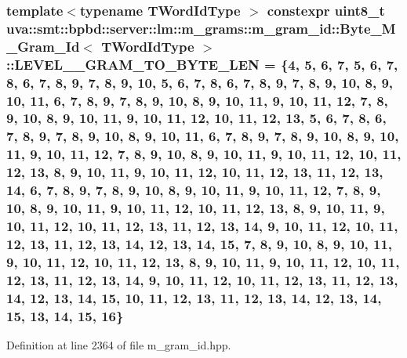 \subsubsection[{L\+E\+V\+E\+L\+\_\+4\+\_\+\+G\+R\+A\+M\+\_\+\+T\+O\+\_\+\+B\+Y\+T\+E\+\_\+\+L\+E\+N}]{\setlength{\rightskip}{0pt plus 5cm}template$<$typename T\+Word\+Id\+Type $>$ constexpr uint8\+\_\+t {\bf uva\+::smt\+::bpbd\+::server\+::lm\+::m\+\_\+grams\+::m\+\_\+gram\+\_\+id\+::\+Byte\+\_\+\+M\+\_\+\+Gram\+\_\+\+Id}$<$ T\+Word\+Id\+Type $>$\+::L\+E\+V\+E\+L\+\_\+\_\+\+G\+R\+A\+M\+\_\+\+T\+O\+\_\+\+B\+Y\+T\+E\+\_\+\+L\+E\+N = \{4, 5, 6, 7, 5, 6, 7, 8, 6, 7, 8, 9, 7, 8, 9, 10, 5, 6, 7, 8, 6, 7, 8, 9, 7, 8, 9, 10, 8, 9, 10, 11, 6, 7, 8, 9, 7, 8, 9, 10, 8, 9, 10, 11, 9, 10, 11, 12, 7, 8, 9, 10, 8, 9, 10, 11, 9, 10, 11, 12, 10, 11, 12, 13, 5, 6, 7, 8, 6, 7, 8, 9, 7, 8, 9, 10, 8, 9, 10, 11, 6, 7, 8, 9, 7, 8, 9, 10, 8, 9, 10, 11, 9, 10, 11, 12, 7, 8, 9, 10, 8, 9, 10, 11, 9, 10, 11, 12, 10, 11, 12, 13, 8, 9, 10, 11, 9, 10, 11, 12, 10, 11, 12, 13, 11, 12, 13, 14, 6, 7, 8, 9, 7, 8, 9, 10, 8, 9, 10, 11, 9, 10, 11, 12, 7, 8, 9, 10, 8, 9, 10, 11, 9, 10, 11, 12, 10, 11, 12, 13, 8, 9, 10, 11, 9, 10, 11, 12, 10, 11, 12, 13, 11, 12, 13, 14, 9, 10, 11, 12, 10, 11, 12, 13, 11, 12, 13, 14, 12, 13, 14, 15, 7, 8, 9, 10, 8, 9, 10, 11, 9, 10, 11, 12, 10, 11, 12, 13, 8, 9, 10, 11, 9, 10, 11, 12, 10, 11, 12, 13, 11, 12, 13, 14, 9, 10, 11, 12, 10, 11, 12, 13, 11, 12, 13, 14, 12, 13, 14, 15, 10, 11, 12, 13, 11, 12, 13, 14, 12, 13, 14, 15, 13, 14, 15, 16\}\hspace{0.3cm}{\ttfamily [static]}}\label{classuva_1_1smt_1_1bpbd_1_1server_1_1lm_1_1m__grams_1_1m__gram__id_1_1_byte___m___gram___id_a54fe1f83a3013ff7d262ec4827a208fb}


Definition at line 2364 of file m\+\_\+gram\+\_\+id.\+hpp.

\hypertarget{classuva_1_1smt_1_1bpbd_1_1server_1_1lm_1_1m__grams_1_1m__gram__id_1_1_byte___m___gram___id_a41e31ed5912eee2359e49780691bae44}{}

